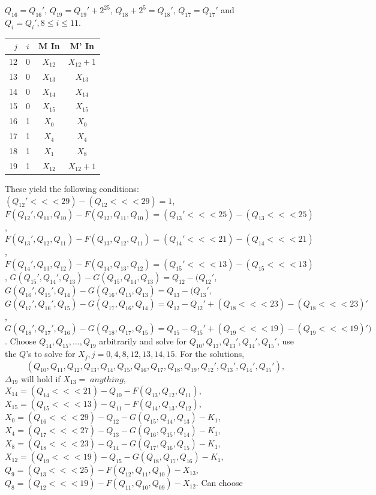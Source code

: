 $Q_{16}=Q_{16}'$,
$Q_{19}=Q_{19}' + 2^{25}$,
$Q_{18} + 2^5 =Q_{18}'$,
$Q_{17}=Q_{17}'$  and
$Q_{i}=Q_{i}', 8 \le i \le 11$.
\begin{center}
\begin{tabular} {|r|ccc|}
\hline
$j$&$i$&M In & M' In\\
\hline
12 &0&$X_{12}$&$X_{12}+1$\\
13 &0&$X_{13}$&$X_{13}$\\
14 &0&$X_{14}$&$X_{14}$\\
15 &0&$X_{15}$&$X_{15}$\\
16 &1&$X_{0}$&$X_{0}$\\
17 &1&$X_{4}$&$X_{4}$\\
18 &1&$X_{1}$&$X_{8}$\\
19 &1&$X_{12}$&$X_{12}+1$\\
\hline
\end{tabular}
\end{center}
These yield the following conditions:
$(Q_{12}' <<< 29) - (Q_{12} <<< 29) =1$,
$F(Q_{12}', Q_{11}, Q_{10}) - F(Q_{12}, Q_{11}, Q_{10})= (Q_{13}'<<<25) - (Q_{13}<<<25)$,
$F(Q_{13}', Q_{12}, Q_{11}) - F(Q_{13}, Q_{12}, Q_{11})= (Q_{14}'<<<21) - (Q_{14}<<<21)$,
$F(Q_{14}', Q_{13}, Q_{12}) - F(Q_{14}, Q_{13}, Q_{12})= (Q_{15}'<<<13) - (Q_{15}<<<13)$,
$G(Q_{15}', Q_{14}', Q_{13}) - G(Q_{15}, Q_{14}, Q_{13})= Q_{12} - (Q_{12}'$,
$G(Q_{16}', Q_{15}', Q_{14}) - G(Q_{16}, Q_{15}, Q_{13})= Q_{13} - (Q_{13}'$,
$G(Q_{17}', Q_{16}', Q_{15}) - G(Q_{17}, Q_{16}, Q_{14})= 
Q_{12} - Q_{12}' + (Q_{18} <<< 23) - (Q_{18} <<< 23)'$,
$G(Q_{18}', Q_{17}', Q_{16}) - G(Q_{18}, Q_{17}, Q_{15})= 
Q_{15} - Q_{15}' + (Q_{19} <<< 19) - (Q_{19} <<< 19)')$.  
Choose $Q_{14}, Q_{15}, \ldots , Q_{19}$ arbitrarily and solve for
$
Q_{10}, Q_{13},
Q_{13}', Q_{14}',
Q_{15}'$, use the $Q$'s to solve for $X_j , j= 0, 4, 8, 12, 13, 14, 15$.
For the solutions,
$$(Q_{10}, Q_{11}, Q_{12}, Q_{13}, Q_{14}, Q_{15}, Q_{16}, 
Q_{17}, Q_{18}, Q_{19}, Q_{12}', Q_{13}', Q_{14}', Q_{15}'),$$ $\Delta_{19}$ will hold
if
$X_{13}= \; anything$,
$X_{14}= (Q_{14} <<< 21) - Q_{10} -F(Q_{13}, Q_{12}, Q_{11}) $,
$X_{15}= (Q_{15} <<< 13) - Q_{11} -F(Q_{14}, Q_{13}, Q_{12}) $,
$X_{ 0}= (Q_{16} <<< 29) - Q_{12} -G(Q_{15}, Q_{14}, Q_{13}) - K_1 $,
$X_{ 4}= (Q_{17} <<< 27) - Q_{13} -G(Q_{16}, Q_{15}, Q_{14})  - K_1$,
$X_{ 8}= (Q_{18} <<< 23) - Q_{14} -G(Q_{17}, Q_{16}, Q_{15})  - K_1$,
$X_{12}= (Q_{19} <<< 19) - Q_{15} -G(Q_{18}, Q_{17}, Q_{16})  - K_1$,
$Q_{ 9}= (Q_{13} <<< 25) -F(Q_{12}, Q_{11}, Q_{10}) - X_{13}$,
$Q_{ 8}= (Q_{12} <<< 19) -F(Q_{11}, Q_{10}, Q_{09}) - X_{12}$.  Can choose
